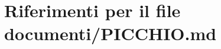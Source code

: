 \hypertarget{PICCHIO_8md}{}\section{Riferimenti per il file documenti/\+P\+I\+C\+C\+H\+IO.md}
\label{PICCHIO_8md}
